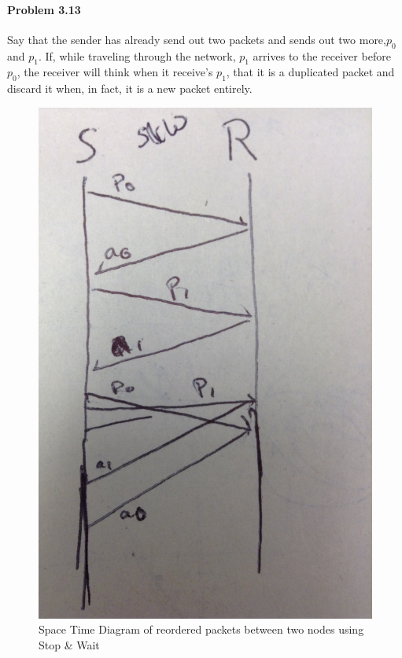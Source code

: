 \documentclass[12pt]{article}
\begin{document}
\paragraph{Problem 3.13}
Say that the sender has already send out two packets and sends out two more,$p_0$ and $p_1$. If, while traveling through the network, $p_1$ arrives to the receiver before $p_0$, the receiver will think when it receive's $p_1$, that it is a duplicated packet and discard it when, in fact, it is a new packet entirely. 
	\begin{figure}[H]
		\caption{Space Time Diagram of reordered packets between two nodes using Stop \& Wait}
		\centering
		\includegraphics[scale=0.1]{SW_switch}	
	\end{figure}
\end{document}
